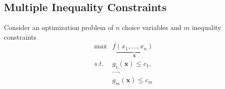 \documentclass[11pt,a4paper]{book}
\theoremstyle{definition}\newtheorem{definition}{Definition}
\theoremstyle{definition}\newtheorem{fact}{Fact}
\theoremstyle{definition}\newtheorem{remark}{Remark}
\theoremstyle{definition}\newtheorem{ex}{Ex.}
\theoremstyle{definition}\newtheorem{project}{Project}
\theoremstyle{definition}\newtheorem{problem}{Problem}
\theoremstyle{definition}\newtheorem{example}{Example}
\numberwithin{theorem}{section}
\numberwithin{corollary}{chapter}
\numberwithin{assumption}{chapter}
\numberwithin{definition}{chapter}
\numberwithin{prop}{chapter}
\numberwithin{notation}{chapter}
\numberwithin{problem}{chapter}
\numberwithin{example}{chapter}
\numberwithin{fact}{chapter}
\numberwithin{ex}{chapter}
\def\x{\mathbf x}
\begin{document}
		\subsection{Multiple Inequality Constraints}
	Consider an optimization problem of $n$ choice variables and $m$ inequality constraints
	\begin{align}
		\max &f\underbrace{(x_1, \dots, x_n)}_{\x} \label{eq:kkt_prob} &                                                          \\
		s.t. &g_1 (\x) \leq c_1, \nonumber &                                                          \\
		& \dots, \nonumber                                         \\
		& g_m (\x) \leq c_m \nonumber                              
	\end{align}
	
\end{document}
